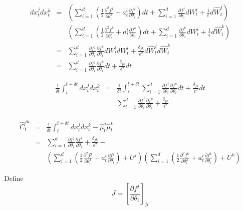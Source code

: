 \documentclass[12pt]{article}
\begin{document}
\begin{eqnarray}
dx_t^j dx_t^k &=& 
\left( \sum_{i=1}^d \left( \frac{1}{2}  \frac{\partial ^2 f^j}{\partial \theta_i^2} + a_t^i \frac{\partial f^j}{\partial \theta_i} \right) dt + \sum_{i=1}^{d} \frac{\partial f^j}{\partial \theta_i} dW_t^i + \frac{1}{\epsilon} d \hat{W}^j_t \right) \\
&& \left( \sum_{i=1}^d \left( \frac{1}{2}  \frac{\partial ^2 f^k}{\partial \theta_i^2} + a_t^i \frac{\partial f^k}{\partial \theta_i} \right) dt + \sum_{i=1}^{d} \frac{\partial f^k}{\partial \theta_i} dW_t^i + \frac{1}{\epsilon} d \hat{W}^k_t \right) \\
&=& \sum_{i=1}^d \frac{\partial f^j}{\partial \theta_i} \frac{\partial f^k}{\partial \theta_i} dW_t^i dW_t^i + \frac{\delta_{jk}}{\epsilon^2}  d \hat{W}^j_t d \hat{W}^k_t  \\
&=& \sum_{i=1}^d \frac{\partial f^j}{\partial \theta_i} \frac{\partial f^k}{\partial \theta_i} dt + \frac{\delta_{jk}}{\epsilon^2}  d t
\end{eqnarray}

\begin{eqnarray}
\frac{1}{\delta t} \int_{t}^{t + \delta t} dx_t^j dx_t^k &=& \frac{1}{\delta t} \int_{t}^{t + \delta t} \sum_{i=1}^d \frac{\partial f^j}{\partial \theta_i} \frac{\partial f^k}{\partial \theta_i} dt + \frac{\delta_{jk}}{\epsilon^2}  d t  \\
&=& \sum_{i=1}^d \frac{\partial f^j}{\partial \theta_i} \frac{\partial f^k}{\partial \theta_i}+ \frac{\delta_{jk}}{\epsilon^2}
\end{eqnarray}


\begin{eqnarray}
\hat{C}_t^{jk} &=& \frac{1}{\delta t} \int_{t}^{t + \delta t} dx_t^j dx_t^k -  \hat{\mu}_t^j \hat{\mu}_t^k \\
&=& \sum_{i=1}^d \frac{\partial f^j}{\partial \theta_i} \frac{\partial f^k}{\partial \theta_i}+ \frac{\delta_{jk}}{\epsilon^2} - \\
&& \left(\sum_{i=1}^d \left( \frac{1}{2}  \frac{\partial ^2 f^j}{\partial \theta_i^2} + a_t^i \frac{\partial f^j}{\partial \theta_i} \right) + U^j \right) \left(\sum_{i=1}^d \left( \frac{1}{2}  \frac{\partial ^2 f^k}{\partial \theta_i^2} + a_t^i \frac{\partial f^k}{\partial \theta_i} \right) + U^k \right)
\end{eqnarray}


Define 
\begin{equation}
J = \left[ \frac{\partial f^j}{\partial \theta_i} \right]_{ji}
\end{equation}
\end{document}

